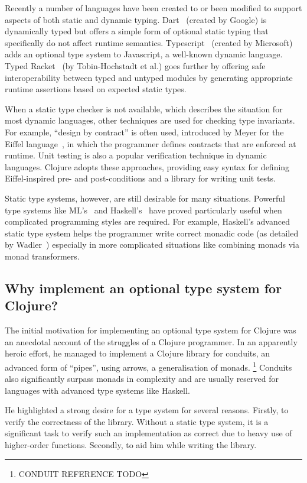 Recently a number of languages have been created to or been modified to support aspects
of both static and dynamic typing.
Dart~\cite{Dart2012} (created by Google) is dynamically typed but offers a simple form of optional
static typing that specifically do not affect runtime semantics.
Typescript~\cite{TypeS2012} (created by Microsoft) adds an optional type system to Javascript,
a well-known dynamic language.
Typed Racket~\cite{TF08,Tob10} (by Tobin-Hochstadt et al.) goes further by offering safe interoperability
between typed and untyped modules by generating appropriate runtime assertions based
on expected static types.

When a static type checker is not available, which describes the situation
for most dynamic languages, other techniques are used for checking
type invariants. For example, ``design by contract'' is often used,
introduced by Meyer for the Eiffel language~\cite{Mey92},
in which the programmer defines contracts that are enforced at runtime.
Unit testing is also a popular verification technique in dynamic languages.
Clojure adopts these approaches, providing easy syntax for defining 
Eiffel-inspired pre- and post-conditions and a library for writing unit tests.

Static type systems, however, are still desirable for many situations.
Powerful type systems like ML's~\cite{Mil97} and Haskell's~\cite{Mar10} have proved particularly useful
when complicated programming styles are required. For example,
Haskell's advanced static type system helps the programmer write correct monadic code
(as detailed by Wadler~\cite{Wad95})
especially in more complicated situations like combining monads via monad transformers.

\subsection{Why implement an optional type system for Clojure?}

The initial motivation for implementing an optional type system
for Clojure was an anecdotal account of the struggles
of a Clojure programmer. In an apparently heroic effort, he managed to 
implement a Clojure library for conduits, an advanced form of ``pipes'',
using arrows, a generalisation of monads.
\footnote{CONDUIT REFERENCE TODO}
Conduits also significantly surpass monads in complexity and are usually reserved
for languages with advanced type systems like Haskell.

He highlighted a strong desire for a type system for several reasons.
Firstly, to verify the correctness of the library.
Without a static type system, it is a significant task
to verify such an implementation as correct due to heavy use
of higher-order functions.
Secondly, to aid him while writing the library.


